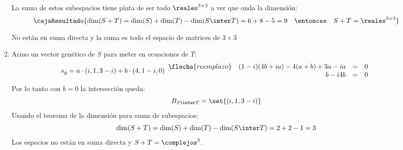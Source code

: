 \begin{enumerate}[label=(\alph*)]
        La suma de estos subespacios tiene pinta de ser todo $\reales^{3 \times 3}$ a ver que onda la dimensión:
        $$
          \cajaResultado{
            \dim(S + T) = \dim(S) + \dim(T) - \dim(S \inter T) = 6 + 8 - 5 = 9
            \quad
            \entonces
            \quad
            S+T = \reales^{3 \times 3}
          }
        $$

        No están en suma directa y la suma es todo el espacio de matrices de $3 \times 3$

  \item
        Armo un vector genético de $S$ para meter en ecuaciones de $T$:
        $$
          s_g = a \cdot (i, 1, 3 - i) + b \cdot (4,1 - i, 0)
          \begin{array}{rrll}
            \flecha{reemplazo} & (1 - i)(4b + ia) - 4(a + b) + 3a - ia & = & 0 \\
                               & b - i4b                               & = & 0
          \end{array}
        $$
        Por lo tanto con $b = 0$ la intersección queda:
        $$
          B_{S \inter T} = \set{(i, 1, 3-i)}
        $$
        Usando el teorema de la dimensión para suma de subespacios:
        $$
          \dim(S + T) = \dim(S) + \dim(T) - \dim(S \inter T) = 2 + 2 - 1 = 3
        $$
        Los espacios no están en suma directa y $S+T = \complejos^3$.
\end{enumerate}

\begin{aportes}
  \item {}
\end{aportes}
